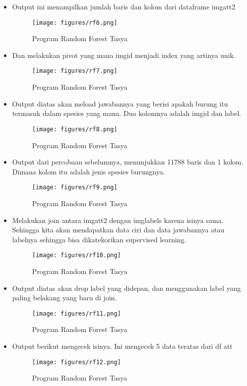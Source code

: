 \begin{itemize}
\item Output ini menampilkan jumlah baris dan kolom dari dataframe imgatt2
\begin{figure}[ht]
\centering
\texttt{[image: figures/rf6.png]}
\caption{Program Random Forest Tasya}
\label{Praktek}
\end{figure}
\item Dan melakukan pivot yang mana imgid menjadi index yang artinya unik.
\begin{figure}[ht]
\centering
\texttt{[image: figures/rf7.png]}
\caption{Program Random Forest Tasya}
\label{Praktek}
\end{figure}

\item Output diatas akan meload jawabannya yang berisi apakah burung itu termasuk dalam spesies yang mana. Dua kolomnya adalah imgid dan label.
\begin{figure}[ht]
\centering
\texttt{[image: figures/rf8.png]}
\caption{Program Random Forest Tasya}
\label{Praktek}
\end{figure}
\item Output dari percobaan sebelumnya, menunjukkan 11788 baris dan 1 kolom. Dimana kolom itu adalah jenis spesies burungnya.
\begin{figure}[ht]
\centering
\texttt{[image: figures/rf9.png]}
\caption{Program Random Forest Tasya}
\label{Praktek}
\end{figure}
\item Melakukan join antara imgatt2 dengan imglabels karena isinya sama. Sehingga kita akan mendapatkan data ciri dan data jawabannya atau labelnya sehingga bisa dikatekorikan supervised learning.
\begin{figure}[ht]
\centering
\texttt{[image: figures/rf10.png]}
\caption{Program Random Forest Tasya}
\label{Praktek}
\end{figure}
\item Output diatas akan drop label yang didepan, dan menggunakan label yang paling belakang yang baru di join.
\begin{figure}[ht]
\centering
\texttt{[image: figures/rf11.png]}
\caption{Program Random Forest Tasya}
\label{Praktek}
\end{figure}
\item Output berikut mengecek isinya. Ini mengecek 5 data teratas dari df att
\begin{figure}[ht]
\centering
\texttt{[image: figures/rf12.png]}
\caption{Program Random Forest Tasya}

\end{figure}
\end{itemize}
